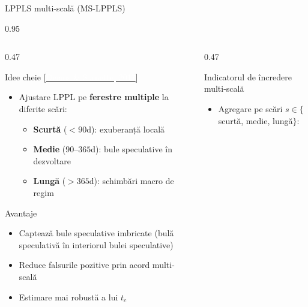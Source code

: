 \documentclass[9pt, aspectratio=169, t]{beamer}
\begin{document}
\begin{frame}{LPPLS multi-scală (MS-LPPLS)}
    \begin{cminipage}{0.95\textwidth}
    {\scriptsize
    \begin{columns}[T]
        \begin{column}{0.47\textwidth}
            \begin{block}{Idee cheie {\scriptsize[\href{https://doi.org/10.1080/14697688.2016.1231417}{\textcolor{white}{Demos \& Sornette, 2017}}]}}
                \begin{itemize}\setlength{\itemsep}{0pt}
                    \item Ajustare LPPL pe \textbf{ferestre multiple} la diferite scări:
                    \begin{itemize}\setlength{\itemsep}{0pt}
                        \item \textbf{Scurtă} ($<90$d): exuberanță locală
                        \item \textbf{Medie} ($90$--$365$d): bule speculative în dezvoltare
                        \item \textbf{Lungă} ($>365$d): schimbări macro de regim
                    \end{itemize}
                \end{itemize}
            \end{block}
            \vspace{-2mm}
            \begin{exampleblock}{Avantaje}
                \begin{itemize}\setlength{\itemsep}{0pt}
                    \item Captează bule speculative imbricate (bulă speculativă în interiorul bulei speculative)
                    \item Reduce falsurile pozitive prin acord multi-scală
                    \item Estimare mai robustă a lui $t_c$
                \end{itemize}
            \end{exampleblock}
        \end{column}
        \begin{column}{0.47\textwidth}
            \begin{alertblock}{Indicatorul de încredere multi-scală}
                \begin{itemize}\setlength{\itemsep}{0pt}
                    \item Agregare pe scări $s \in \{$scurtă, medie, lungă$\}$:

\end{itemize}
\end{alertblock}
\end{column}
\end{columns}}
\end{cminipage}
\end{frame}
\end{document}
